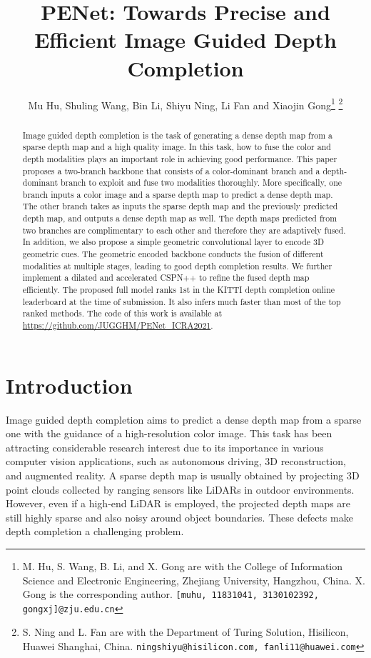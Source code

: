 \documentclass[letterpaper, 10 pt, conference]{ieeeconf}
\title{PENet: Towards Precise and Efficient Image Guided Depth Completion}
\author{Mu Hu, Shuling Wang, Bin Li, Shiyu Ning, Li Fan and Xiaojin Gong\thanks{M. Hu, S. Wang, B. Li, and X. Gong are with the College of Information Science and Electronic Engineering, Zhejiang University, Hangzhou, China. X. Gong is the corresponding author. {\tt\small [muhu, 11831041, 3130102392, gongxj]@zju.edu.cn}}
\thanks{
S. Ning and L. Fan are with the Department of Turing Solution, Hisilicon, Huawei Shanghai, China. {\tt\small ningshiyu@hisilicon.com, fanli11@huawei.com}}}
\begin{document}
\maketitle
\thispagestyle{empty}
\pagestyle{empty}


\begin{abstract}
Image guided depth completion is the task of generating a dense depth map from a sparse depth map and a high quality image. In this task, how to  fuse the color and depth modalities plays an important role in achieving good performance. This paper proposes a two-branch backbone that consists of a color-dominant branch and a depth-dominant branch to exploit and fuse two modalities thoroughly. More specifically, one branch inputs a color image and a sparse depth map to predict a dense depth map. The other branch takes as inputs the sparse depth map and the previously predicted depth map, and outputs a dense depth map as well. The depth maps predicted from two branches are complimentary to each other and therefore they are adaptively fused. In addition, we also propose a simple geometric convolutional layer to encode 3D geometric cues. The geometric encoded backbone conducts the fusion of different modalities at multiple stages, leading to good depth completion results. We further implement a dilated and accelerated CSPN++ to refine the fused depth map efficiently. The proposed full model ranks 1st in the KITTI depth completion online leaderboard at the time of submission. It also infers much faster than most of the top ranked methods. The code of this work is available at \textcolor{red}{\url{https://github.com/JUGGHM/PENet_ICRA2021}}. 






\end{abstract}


\section{Introduction}
Image guided depth completion aims to predict a dense depth map from a sparse one with the guidance of a high-resolution color image. This task has been attracting considerable research interest due to its importance in various computer vision applications, such as autonomous driving, 3D reconstruction, and augmented reality. A sparse depth map is usually obtained by projecting 3D point clouds collected by ranging sensors like LiDARs in outdoor environments. However, even if a high-end LiDAR is employed, the projected depth maps are still highly sparse and also noisy around object boundaries. These defects make depth completion a challenging problem. 
\end{document}

